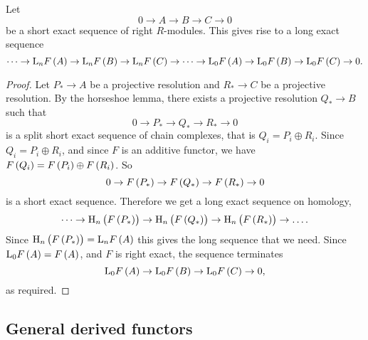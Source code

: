 
\begin{proposition}
Let
$$ 0 \to A \to B \to C \to 0 $$
be a short exact sequence of right $ R $-modules. This gives rise to a long exact sequence
$$ \dots \to \L_nF\br{A} \to \L_nF\br{B} \to \L_nF\br{C} \to \dots \to \L_0F\br{A} \to \L_0F\br{B} \to \L_0F\br{C} \to 0. $$
\end{proposition}

\begin{proof}
Let $ P_* \to A $ be a projective resolution and $ R_* \to C $ be a projective resolution. By the horseshoe lemma, there exists a projective resolution $ Q_* \to B $ such that
$$ 0 \to P_* \to Q_* \to R_* \to 0 $$
is a split short exact sequence of chain complexes, that is $ Q_i = P_i \oplus R_i $. Since $ Q_i = P_i \oplus R_i $, and since $ F $ is an additive functor, we have $ F\br{Q_i} = F\br{P_i} \oplus F\br{R_i} $. So
$$ 0 \to F\br{P_*} \to F\br{Q_*} \to F\br{R_*} \to 0 $$
is a short exact sequence. Therefore we get a long exact sequence on homology,
$$ \dots \to \H_n\br{F\br{P_*}} \to \H_n\br{F\br{Q_*}} \to \H_n\br{F\br{R_*}} \to \dots. $$
Since $ \H_n\br{F\br{P_*}} = \L_nF\br{A} $ this gives the long sequence that we need. Since $ \L_0F\br{A} = F\br{A} $, and $ F $ is right exact, the sequence terminates
$$ \L_0F\br{A} \to \L_0F\br{B} \to \L_0F\br{C} \to 0, $$
as required.
\end{proof}

\subsection{General derived functors}

